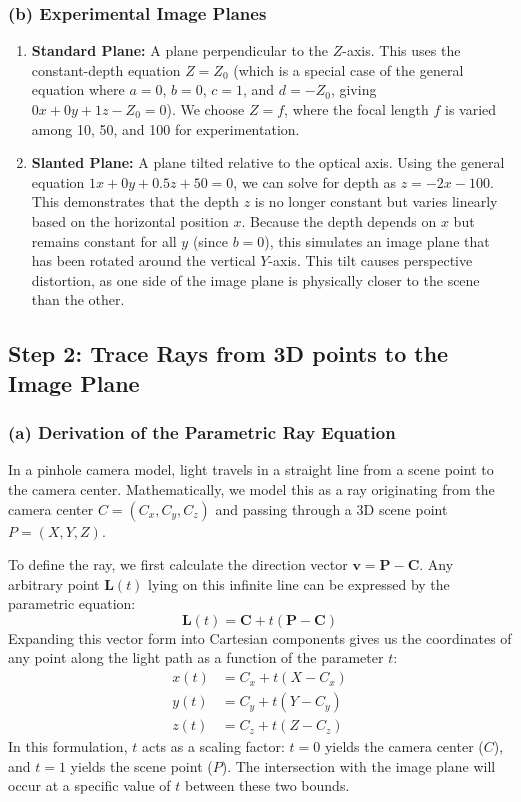 \documentclass[12pt]{article}
\begin{document}
\subsubsection*{(b) Experimental Image Planes}
\begin{enumerate}
    \item \textbf{Standard Plane:} A plane perpendicular to the $Z$-axis. This uses the constant-depth equation $Z = Z_0$ (which is a special case of the general equation where $a=0$, $b=0$, $c=1$, and $d = -Z_0$, giving $0x + 0y + 1z - Z_0 = 0$). We choose $Z = f$, where the focal length $f$ is varied among 10, 50, and 100 for experimentation.
    \item \textbf{Slanted Plane:} A plane tilted relative to the optical axis. Using the general equation $1x + 0y + 0.5z + 50 = 0$, we can solve for depth as $z = -2x - 100$. This demonstrates that the depth $z$ is no longer constant but varies linearly based on the horizontal position $x$. Because the depth depends on $x$ but remains constant for all $y$ (since $b=0$), this simulates an image plane that has been rotated around the vertical $Y$-axis. This tilt causes perspective distortion, as one side of the image plane is physically closer to the scene than the other.
\end{enumerate}

\subsection*{Step 2: Trace Rays from 3D points to the Image Plane}

\subsubsection*{(a) Derivation of the Parametric Ray Equation}

In a pinhole camera model, light travels in a straight line from a scene point to the camera center. Mathematically, we model this as a ray originating from the camera center $C = (C_x, C_y, C_z)$ and passing through a 3D scene point $P = (X, Y, Z)$. 

To define the ray, we first calculate the direction vector $\mathbf{v} = \mathbf{P} - \mathbf{C}$. Any arbitrary point $\mathbf{L}(t)$ lying on this infinite line can be expressed by the parametric equation:
\begin{equation}
    \mathbf{L}(t) = \mathbf{C} + t(\mathbf{P} - \mathbf{C})
\end{equation}
Expanding this vector form into Cartesian components gives us the coordinates of any point along the light path as a function of the parameter $t$:
\begin{align}
    x(t) &= C_x + t(X - C_x) \nonumber \\
    y(t) &= C_y + t(Y - C_y) \\
    z(t) &= C_z + t(Z - C_z) \nonumber
\end{align}
In this formulation, $t$ acts as a scaling factor: $t=0$ yields the camera center ($C$), and $t=1$ yields the scene point ($P$). The intersection with the image plane will occur at a specific value of $t$ between these two bounds.
\end{document}
